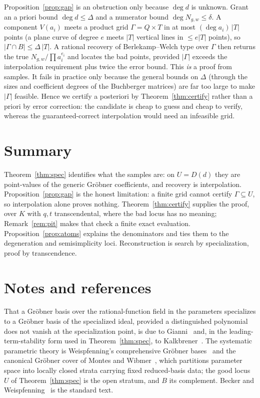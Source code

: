 \documentclass[11pt]{article}
\theoremstyle{definition}
\begin{document}
Proposition~\ref{prop:gap} is an obstruction only because $\deg d$ is unknown. Grant an a priori
bound $\deg d\le\Delta$ and a numerator bound $\deg N_{g,w}\le\delta$. A component $V(a_i)$ meets a
product grid $\Gamma=Q\times T$ in at most $(\deg a_i)\,|T|$ points (a plane curve of degree $e$
meets $|T|$ vertical lines in $\le e|T|$ points), so $|\Gamma\cap B|\le\Delta\,|T|$. A rational
recovery of Berlekamp--Welch type over $\Gamma$ then returns the true $N_{g,w}/\prod a_i^{e_i}$ and
locates the bad points, provided $|\Gamma|$ exceeds the interpolation requirement plus twice the
error bound. This \emph{is} a proof from samples. It fails in practice only because the general
bounds on $\Delta$ (through the sizes and coefficient degrees of the Buchberger matrices) are far too
large to make $|\Gamma|$ feasible. Hence we certify a posteriori by Theorem~\ref{thm:certify} rather
than a priori by error correction: the candidate is cheap to guess and cheap to verify, whereas the
guaranteed-correct interpolation would need an infeasible grid.

\section*{Summary}

Theorem~\ref{thm:spec} identifies what the samples are: on $U=D(d)$ they are point-values of the
generic Gr\"obner coefficients, and recovery is interpolation. Proposition~\ref{prop:gap} is the
honest limitation: a finite grid cannot certify $\Gamma\subseteq U$, so interpolation alone proves
nothing. Theorem~\ref{thm:certify} supplies the proof, over $K$ with $q,t$ transcendental, where the
bad locus has no meaning; Remark~\ref{rem:pit} makes that check a finite exact evaluation.
Proposition~\ref{prop:atoms} explains the denominators and ties them to the degeneration and
semisimplicity loci. Reconstruction is search by specialization, proof by transcendence.

\section*{Notes and references}

That a Gr\"obner basis over the rational-function field in the parameters specializes to a Gr\"obner
basis of the specialized ideal, provided a distinguished polynomial does not vanish at the
specialization point, is due to Gianni~\cite{Gianni} and, in the leading-term-stability form used in
Theorem~\ref{thm:spec}, to Kalkbrener~\cite{Kalkbrener}. The systematic parametric theory is
Weispfenning's comprehensive Gr\"obner bases~\cite{Weispfenning} and the canonical Gr\"obner cover of
Montes and Wibmer~\cite{MontesWibmer}, which partitions parameter space into locally closed strata
carrying fixed reduced-basis data; the good locus $U$ of Theorem~\ref{thm:spec} is the open stratum,
and $B$ its complement. Becker and Weispfenning~\cite{BeckerWeispfenning} is the standard text.
\end{document}

